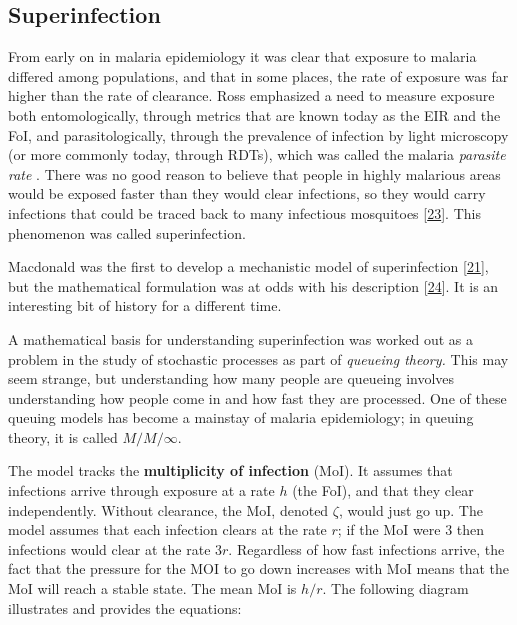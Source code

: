 \documentclass[
]{book}
\begin{document}
\hypertarget{superinfection}{%
\subsection{Superinfection}\label{superinfection}}

From early on in malaria epidemiology it was clear that exposure to malaria differed among populations, and that in some places, the rate of exposure was far higher than the rate of clearance. Ross emphasized a need to measure exposure both entomologically, through metrics that are known today as the EIR and the FoI, and parasitologically, through the prevalence of infection by light microscopy (or more commonly today, through RDTs), which was called the malaria \emph{parasite rate} . There was no good reason to believe that people in highly malarious areas would be exposed faster than they would clear infections, so they would carry infections that could be traced back to many infectious mosquitoes {[}\protect\hyperlink{ref-WaltonG1947ControlMalaria}{23}{]}. This phenomenon was called superinfection.

Macdonald was the first to develop a mechanistic model of superinfection {[}\protect\hyperlink{ref-MacdonaldG1950_Superinfection}{21}{]}, but the mathematical formulation was at odds with his description {[}\protect\hyperlink{ref-FinePEM1975SuperinfectionProblem}{24}{]}. It is an interesting bit of history for a different time.

A mathematical basis for understanding superinfection was worked out as a problem in the study of stochastic processes as part of \emph{queueing theory.} This may seem strange, but understanding how many people are queueing involves understanding how people come in and how fast they are processed. One of these queuing models has become a mainstay of malaria epidemiology; in queuing theory, it is called \(M/M/\infty\).

The model tracks the \textbf{multiplicity of infection} (MoI). It assumes that infections arrive through exposure at a rate \(h\) (the FoI), and that they clear independently. Without clearance, the MoI, denoted \(\zeta\), would just go up. The model assumes that each infection clears at the rate \(r\); if the MoI were \(3\) then infections would clear at the rate \(3r\). Regardless of how fast infections arrive, the fact that the pressure for the MOI to go down increases with MoI means that the MoI will reach a stable state. The mean MoI is \(h/r.\) The following diagram illustrates and provides the equations:
\end{document}
